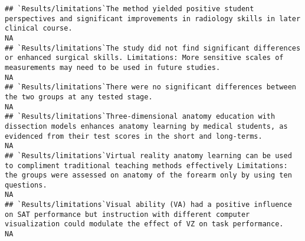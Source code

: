 \documentclass[]{article}
\begin{document}
\begin{verbatim}
## `Results/limitations`The method yielded positive student perspectives and significant improvements in radiology skills in later clinical course.                                                                                                                                                                                                                                                                                                                                     NA
## `Results/limitations`The study did not find significant differences or enhanced surgical skills. Limitations: More sensitive scales of measurements may need to be used in future studies.                                                                                                                                                                                                                                                                                           NA
## `Results/limitations`There were no significant differences between the two groups at any tested stage.                                                                                                                                                                                                                                                                                                                                                                               NA
## `Results/limitations`Three-dimensional anatomy education with dissection models enhances anatomy learning by medical students, as evidenced from their test scores in the short and long-terms.                                                                                                                                                                                                                                                                                      NA
## `Results/limitations`Virtual reality anatomy learning can be used to compliment traditional teaching methods effectively Limitations: the groups were assessed on anatomy of the forearm only by using ten questions.                                                                                                                                                                                                                                                                NA
## `Results/limitations`Visual ability (VA) had a positive influence on SAT performance but instruction with different computer visualization could modulate the effect of VZ on task performance.                                                                                                                                                                                                                                                                                      NA

\end{verbatim}
\end{document}
